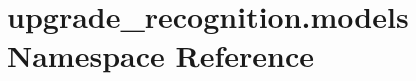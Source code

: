 \hypertarget{namespaceupgrade__recognition_1_1models}{\section{upgrade\-\_\-recognition.\-models Namespace Reference}
\label{namespaceupgrade__recognition_1_1models}
}
